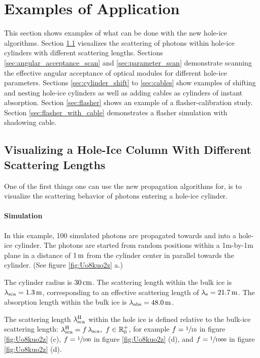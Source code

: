 \section{Examples of Application}
\label{sec:applications}

This section shows examples of what can be done with the new hole-ice
algorithms. Section \ref{sec:scattering_simulation} visualizes the
scattering of photons within hole-ice cylinders with different
scattering lengths. Sections \ref{sec:angular_acceptance_scan} and
\ref{sec:parameter_scan} demonstrate scanning the effective angular
acceptance of optical modules for different hole-ice parameters.
Sections \ref{sec:cylinder_shift} to \ref{sec:cables} show examples of
shifting and nesting hole-ice cylinders as well as adding cables as
cylinders of instant absorption. Section \ref{sec:flasher} shows an
example of a flasher-calibration study. Section
\ref{sec:flasher_with_cable} demonstrates a flasher simulation with
shadowing cable.

\subsection{Visualizing a Hole-Ice Column With Different Scattering Lengths}
\label{sec:scattering_simulation}

One of the first things one can use the new propagation algorithms for,
is to visualize the scattering behavior of photons entering a hole-ice
cylinder.

\paragraph{Simulation}

In this example, 100 simulated photons are propagated towards and into a
hole-ice cylinder. The photons are started from random positions within
a 1m-by-1m plane in a distance of \(1\text{\,m}\) from the cylinder center in
parallel towards the cylinder. (See figure \ref{fig:Uo8kuo2z} a.)

The cylinder radius is \(30\text{\,cm}\). The scattering length within the bulk
ice is \(\lambda_\text{sca} = 1.3\text{\,m}\), corresponding to an effective scattering
length of \(\lambda_\text{e} = 21.7\text{\,m}\). The absorption length within the
bulk ice is \(\lambda_\text{abs} = 48.0\text{\,m}\).

The scattering length \(\lambda^\text{H}_\text{sca}\) within the hole ice is defined
relative to the bulk-ice scattering length:
\(\lambda^\text{H}_\text{sca} = f\,\lambda_\text{sca}, \ f \in \mathbb{R}_0^+\), for example
\(f = \sfrac{1}{10}\) in figure \ref{fig:Uo8kuo2z} (c),
\(f = \sfrac{1}{100}\) in figure \ref{fig:Uo8kuo2z} (d), and
\(f = \sfrac{1}{1000}\) in figure \ref{fig:Uo8kuo2z} (d).

